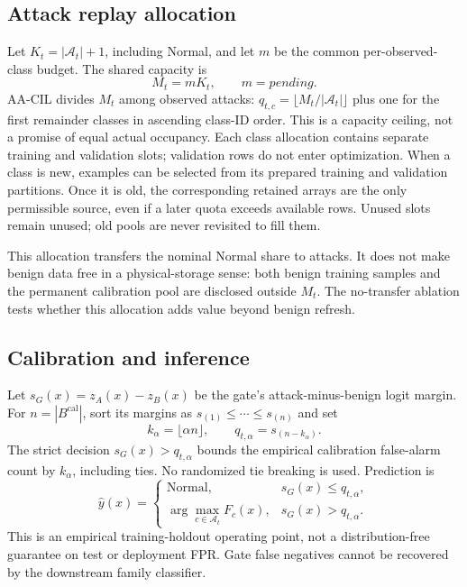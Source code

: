 \documentclass[10pt,twocolumn]{article}
\newcommand{\pending}{\textit{pending}}
\providecommand{\MemoryPerClass}{\pending}
\begin{document}
\subsection{Attack replay allocation}
Let $K_t=|\mathcal A_t|+1$, including Normal, and let $m$ be the common per-observed-class budget. The shared capacity is
\begin{equation}
 M_t=mK_t,\qquad m=\MemoryPerClass.
\end{equation}
AA-CIL divides $M_t$ among observed attacks: $q_{t,c}=\lfloor M_t/|\mathcal A_t|\rfloor$ plus one for the first remainder classes in ascending class-ID order. This is a capacity ceiling, not a promise of equal actual occupancy. Each class allocation contains separate training and validation slots; validation rows do not enter optimization. When a class is new, examples can be selected from its prepared training and validation partitions. Once it is old, the corresponding retained arrays are the only permissible source, even if a later quota exceeds available rows. Unused slots remain unused; old pools are never revisited to fill them.

This allocation transfers the nominal Normal share to attacks. It does not make benign data free in a physical-storage sense: both benign training samples and the permanent calibration pool are disclosed outside $M_t$. The no-transfer ablation tests whether this allocation adds value beyond benign refresh.

\subsection{Calibration and inference}
Let $s_G(x)=z_A(x)-z_B(x)$ be the gate's attack-minus-benign logit margin. For $n=|B^{\mathrm{cal}}|$, sort its margins as $s_{(1)}\leq\cdots\leq s_{(n)}$ and set
\begin{equation}
 k_\alpha=\lfloor\alpha n\rfloor,\qquad
 q_{t,\alpha}=s_{(n-k_\alpha)}.
\end{equation}
The strict decision $s_G(x)>q_{t,\alpha}$ bounds the empirical calibration false-alarm count by $k_\alpha$, including ties. No randomized tie breaking is used. Prediction is
\begin{equation}
 \hat y(x)=\begin{cases}
 \mathrm{Normal},&s_G(x)\leq q_{t,\alpha},\\
 \arg\max_{c\in\mathcal A_t}F_c(x),&s_G(x)>q_{t,\alpha}.
 \end{cases}
\end{equation}
This is an empirical training-holdout operating point, not a distribution-free guarantee on test or deployment FPR. Gate false negatives cannot be recovered by the downstream family classifier.
\end{document}
